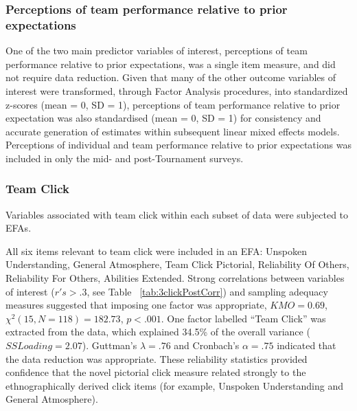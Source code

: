 \subsubsection{Perceptions of team performance relative to prior expectations}
One of the two main predictor variables of interest, perceptions of team performance relative to prior expectations, was a single item measure, and did not require data reduction.  Given that many of the other outcome variables of interest were transformed, through Factor Analysis procedures, into standardized z-scores (mean = 0, SD = 1), perceptions of team performance relative to prior expectation was also standardised (mean = 0, SD = 1) for consistency and accurate generation of estimates within subsequent linear mixed effects models. Perceptions of individual and team performance relative to prior expectations was included in only the mid- and post-Tournament surveys.


\subsubsection{Team Click}
Variables associated with team click within each subset of data were subjected to EFAs.

All six items relevant to team click were included in an EFA: Unspoken Understanding, General Atmosphere, Team Click Pictorial, Reliability Of Others, Reliability For Others, Abilities Extended.  Strong correlations between variables of interest ($r's > .3$, see Table ~\ref{tab:3clickPostCorr}) and sampling adequacy measures suggested that imposing one factor was appropriate, $KMO =  0.69$, $\chi^2(15, N = 118) = 182.73$, $p < .001$.  One factor labelled ``Team Click'' was extracted from the data, which explained 34.5\% of the overall variance ($SS Loading = 2.07$).  Guttman's $\lambda =.76$ and Cronbach's $\alpha = .75$ indicated that the data reduction was appropriate.  These reliability statistics provided confidence that the novel pictorial click measure related strongly to the ethnographically derived click items (for example, Unspoken Understanding and General Atmosphere).

